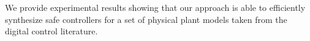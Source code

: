 \documentclass[sigconf]{llncs}
\begin{document}

We provide experimental results showing that our approach is able to
efficiently synthesize safe controllers for a set of physical
plant models taken from the digital control literature.
\end{document}
